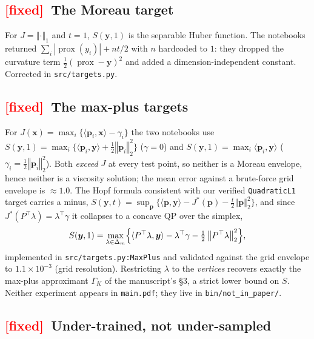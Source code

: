 \documentclass[11pt]{article}
\newcommand{\file}[1]{\texttt{#1}}
\newcommand{\bx}{\boldsymbol{x}}
\newcommand{\by}{\boldsymbol{y}}
\newcommand{\bp}{\boldsymbol{p}}
\newcommand{\abs}[1]{\left\vert #1 \right\vert}
\newcommand{\normsq}[1]{\left\Vert #1 \right\Vert_{2}^{2}}
\newcommand{\normone}[1]{\left\Vert #1 \right\Vert_{1}}
\DeclareMathOperator{\prox}{prox}
\newcommand{\MUST}{\textcolor{red}{\textbf{[fixed]}}}
\begin{document}
\subsection{\MUST\ The Moreau target}
\label{sec:moreau}

For $J=\normone{\cdot}$ and $t=1$, $S(\by,1)$ is the separable Huber function.
The notebooks returned $\sum_{i}\abs{\prox(y_{i})} + nt/2$ with $n$ hardcoded to
$1$: they dropped the curvature term $\tfrac12(\prox-\by)^{2}$ and added a
dimension-independent constant. Corrected in \file{src/targets.py}.

\subsection{\MUST\ The max-plus targets}
\label{sec:maxplus}

For $J(\bx)=\max_{i}\{\langle\bp_{i},\bx\rangle-\gamma_{i}\}$ the two notebooks
use $S(\by,1)=\max_{i}\{\langle\bp_{i},\by\rangle+\tfrac12\normsq{\bp_{i}}\}$
($\gamma=0$) and $S(\by,1)=\max_{i}\langle\bp_{i},\by\rangle$
($\gamma_{i}=\tfrac12\normsq{\bp_{i}}$). Both \emph{exceed} $J$ at every test
point, so neither is a Moreau envelope, hence neither is a viscosity solution;
the mean error against a brute-force grid envelope is $\approx1.0$. The Hopf
formula consistent with our verified \texttt{QuadraticL1} target carries a
minus, $S(\by,t)=\sup_{\bp}\{\langle\bp,\by\rangle-J^{*}(\bp)-\tfrac{t}{2}\normsq{\bp}\}$,
and since $J^{*}(P^{\top}\lambda)=\lambda^{\top}\gamma$ it collapses to a concave
QP over the simplex,
\[
  S(\by,1)=\max_{\lambda\in\Delta_{m}}
    \Bigl\{\langle P^{\top}\lambda,\by\rangle-\lambda^{\top}\gamma
      -\tfrac12\normsq{P^{\top}\lambda}\Bigr\},
\]
implemented in \file{src/targets.py:MaxPlus} and validated against the grid
envelope to $1.1\times10^{-3}$ (grid resolution). Restricting $\lambda$ to the
\emph{vertices} recovers exactly the max-plus approximant $\Gamma_{K}$ of the
manuscript's \S3, a strict lower bound on $S$. Neither experiment appears in
\file{main.pdf}; they live in \file{bin/not\_in\_paper/}.

\subsection{\MUST\ Under-trained, not under-sampled}
\label{sec:steps}
\end{document}
